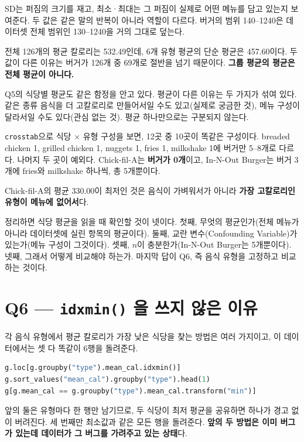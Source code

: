 SD는 퍼짐의 크기를 재고, 최소·최대는 그 퍼짐이 실제로 어떤 메뉴를 담고 있는지 보여준다.
두 값은 같은 말의 반복이 아니라 역할이 다르다. 버거의 범위 140--1240은 데이터셋 전체
범위인 130--1240을 거의 그대로 덮는다.

전체 126개의 평균 칼로리는 532.49인데, 6개 유형 평균의 단순 평균은 457.60이다. 두 값이
다른 이유는 버거가 126개 중 69개로 절반을 넘기 때문이다. \textbf{그룹 평균의 평균은
전체 평균이 아니다.}

Q5의 식당별 평균도 같은 함정을 안고 있다. 평균이 다른 이유는 두 가지가 섞여 있다.
같은 종류 음식을 더 고칼로리로 만들어서일 수도 있고(실제로 궁금한 것), 메뉴 구성이
달라서일 수도 있다(관심 없는 것). 평균 하나만으로는 구분되지 않는다.

\begin{example}
\label{ex:hw1-menu-mix}
\texttt{crosstab}으로 식당 $\times$ 유형 구성을 보면, 12곳 중 10곳이 똑같은 구성이다.
breaded chicken 1, grilled chicken 1, nuggets 1, fries 1, milkshake 1에 버거만 5--8개로
다르다. 나머지 두 곳이 예외다. Chick-fil-A는 \textbf{버거가 0개}이고, In-N-Out Burger는
버거 3개에 fries와 milkshake 하나씩, 총 5개뿐이다.

Chick-fil-A의 평균 330.00이 최저인 것은 음식이 가벼워서가 아니라 \textbf{가장 고칼로리인
유형이 메뉴에 없어서}다.
\end{example}

정리하면 식당 평균을 읽을 때 확인할 것이 넷이다. 첫째, 무엇의 평균인가(전체 메뉴가
아니라 데이터셋에 실린 항목의 평균이다). 둘째, 교란 변수(Confounding Variable)가
있는가(메뉴 구성이 그것이다). 셋째, $n$이 충분한가(In-N-Out Burger는 5개뿐이다). 넷째,
그래서 어떻게 비교해야 하는가. 마지막 답이 Q6, 즉 음식 유형을 고정하고 비교하는 것이다.

\section{Q6 --- \texttt{idxmin()} 을 쓰지 않은 이유}
\label{sec:hw1-q6}

각 음식 유형에서 평균 칼로리가 가장 낮은 식당을 찾는 방법은 여러 가지이고, 이 데이터에서는
셋 다 똑같이 6행을 돌려준다.

\begin{lstlisting}[language=Python]
g.loc[g.groupby("type").mean_cal.idxmin()]
g.sort_values("mean_cal").groupby("type").head(1)
g[g.mean_cal == g.groupby("type").mean_cal.transform("min")]
\end{lstlisting}

앞의 둘은 유형마다 한 행만 남기므로, 두 식당이 최저 평균을 공유하면 하나가 경고 없이
버려진다. 세 번째만 최소값과 같은 모든 행을 돌려준다. \textbf{앞의 두 방법은 이미 버그가
있는데 데이터가 그 버그를 가려주고 있는 상태}다.


